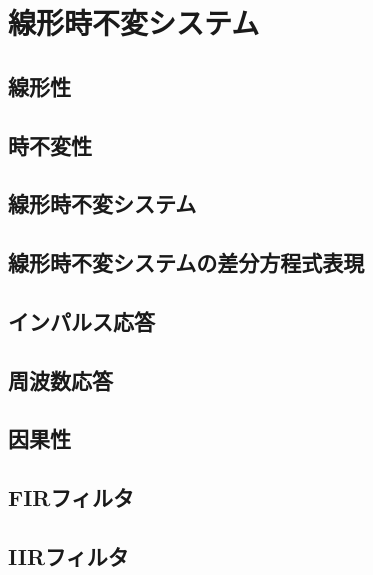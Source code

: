 \section{線形時不変システム}

\subsection{線形性}

\subsection{時不変性}

\subsection{線形時不変システム}

\subsection{線形時不変システムの差分方程式表現}

\subsection{インパルス応答}

\subsection{周波数応答}

\subsection{因果性}

\subsection{FIRフィルタ}

\subsection{IIRフィルタ}

